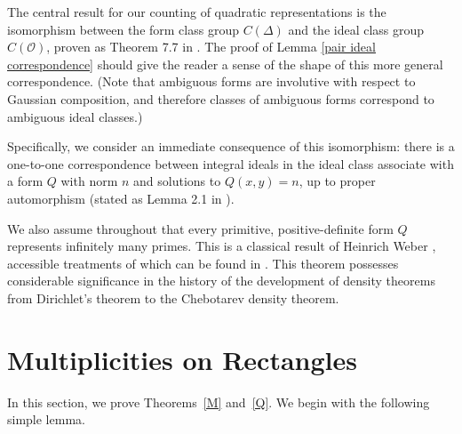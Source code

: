 \documentclass[11pt]{amsart}
\theoremstyle{definition}
\begin{document}
The central result for our counting of quadratic representations is the isomorphism between the form class group $C(\Delta)$ and the ideal class group $C(\mathcal{O})$, proven as Theorem 7.7 in \cite{Cox}. The proof of Lemma \ref{pair ideal correspondence} should give the reader a sense of the shape of this more general correspondence. (Note that ambiguous forms are involutive with respect to Gaussian composition, and therefore classes of ambiguous forms correspond to ambiguous ideal classes.)

Specifically, we consider an immediate consequence of this isomorphism: there is a one-to-one correspondence between integral ideals in the ideal class associate with a form $Q$ with norm $n$ and solutions to $Q(x,y)=n$, up to proper automorphism (stated as Lemma 2.1 in \cite{BG06}).

We also assume throughout that every primitive, positive-definite form $Q$ represents infinitely many primes. This is a classical result of Heinrich Weber \cite{Weber1882}, accessible treatments of which can be found in \cite{Bri54,SW92}. This theorem possesses considerable significance in the history of the development of density theorems from Dirichlet's theorem to the Chebotarev density theorem.

\section{Multiplicities on Rectangles}\label{s:rectangles}

In this section, we prove Theorems~\ref{M} and~\ref{Q}. We begin with the following simple lemma.
\end{document}

